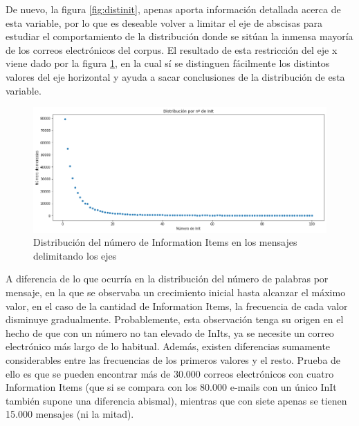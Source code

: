 De nuevo, la figura \ref{fig:distinit}, apenas aporta información detallada acerca de esta variable, por lo que es deseable volver a limitar el eje de abscisas para estudiar el comportamiento de la distribución donde se sitúan la inmensa mayoría de los correos electrónicos del corpus. El resultado de esta restricción del eje x viene dado por la figura \ref{fig:distmininit}, en la cual sí se distinguen fácilmente los distintos valores del eje horizontal y ayuda a sacar conclusiones de la distribución de esta variable.

\begin{figure}[h]
	\centering%
	\centerline{\includegraphics[width = 1.3\textwidth]{Imagenes/Bitmap/distminiinits.png}}%
	\caption{Distribución del número de Information Items en los mensajes delimitando los ejes}%
	\label{fig:distmininit}
\end{figure}

A diferencia de lo que ocurría en la distribución del número de palabras por mensaje, en la que se observaba un crecimiento inicial hasta alcanzar el máximo valor, en el caso de la cantidad de Information Items, la frecuencia de cada valor disminuye gradualmente. Probablemente, esta observación tenga su origen en el hecho de que con un número no tan elevado de InIts, ya se necesite un correo electrónico más largo de lo habitual. Además, existen diferencias sumamente considerables entre las frecuencias de los primeros valores y el resto. Prueba de ello es que se pueden encontrar más de 30.000 correos electrónicos con cuatro Information Items (que si se compara con los 80.000 e-mails con un único InIt también supone una diferencia abismal), mientras que con siete apenas se tienen 15.000 mensajes (ni la mitad).

